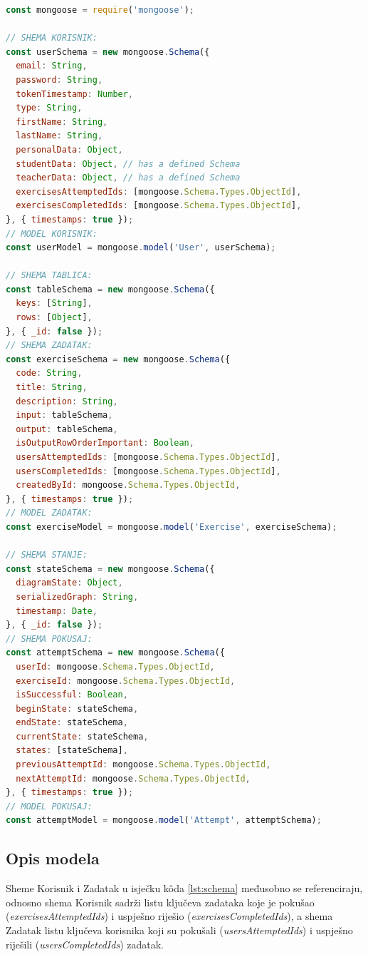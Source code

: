 \documentclass[times, utf8, diplomski, numeric]{fer}
\newcommand{\razmakp}{\vspace{18pt}}
\newcommand{\razmaks}{\vspace{10pt}}
\begin{document}
\razmakp %
\begin{lstlisting}[language=JavaScript, caption={Pojednostavljena verzija podatkovnih modela, odnosno Mongoose shema dokumenata spremljenih u Mongo bazi}, label={lst:schema}]
const mongoose = require('mongoose');

// SHEMA KORISNIK:
const userSchema = new mongoose.Schema({
  email: String,
  password: String,
  tokenTimestamp: Number,
  type: String,
  firstName: String,
  lastName: String,
  personalData: Object,
  studentData: Object, // has a defined Schema
  teacherData: Object, // has a defined Schema
  exercisesAttemptedIds: [mongoose.Schema.Types.ObjectId],
  exercisesCompletedIds: [mongoose.Schema.Types.ObjectId],
}, { timestamps: true });
// MODEL KORISNIK:
const userModel = mongoose.model('User', userSchema);

// SHEMA TABLICA:
const tableSchema = new mongoose.Schema({
  keys: [String],
  rows: [Object],
}, { _id: false });
// SHEMA ZADATAK:
const exerciseSchema = new mongoose.Schema({
  code: String,
  title: String,
  description: String,
  input: tableSchema,
  output: tableSchema,
  isOutputRowOrderImportant: Boolean,
  usersAttemptedIds: [mongoose.Schema.Types.ObjectId],
  usersCompletedIds: [mongoose.Schema.Types.ObjectId],
  createdById: mongoose.Schema.Types.ObjectId,
}, { timestamps: true });
// MODEL ZADATAK:
const exerciseModel = mongoose.model('Exercise', exerciseSchema);

// SHEMA STANJE:
const stateSchema = new mongoose.Schema({
  diagramState: Object,
  serializedGraph: String,
  timestamp: Date,
}, { _id: false });
// SHEMA POKUSAJ:
const attemptSchema = new mongoose.Schema({
  userId: mongoose.Schema.Types.ObjectId,
  exerciseId: mongoose.Schema.Types.ObjectId,
  isSuccessful: Boolean,
  beginState: stateSchema,
  endState: stateSchema,
  currentState: stateSchema,
  states: [stateSchema],
  previousAttemptId: mongoose.Schema.Types.ObjectId,
  nextAttemptId: mongoose.Schema.Types.ObjectId,
}, { timestamps: true });
// MODEL POKUSAJ:
const attemptModel = mongoose.model('Attempt', attemptSchema);
\end{lstlisting}
\razmaks

\subsection{Opis modela}

Sheme Korisnik i Zadatak u isječku kôda \ref{lst:schema} međusobno se referenciraju, odnosno shema Korisnik sadrži listu ključeva zadataka koje je pokušao (\emph{exercisesAttemptedIds}) i uspješno riješio (\emph{exercisesCompletedIds}), a shema Zadatak listu ključeva korisnika koji su pokušali (\emph{usersAttemptedIds}) i uspješno riješili (\emph{usersCompletedIds}) zadatak.
\end{document}
